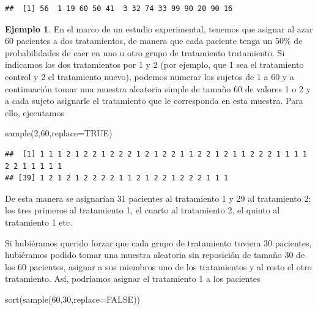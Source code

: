 \documentclass[
]{book}
\newenvironment{Shaded}{\begin{snugshade}}{\end{snugshade}}
\newcommand{\AttributeTok}[1]{\textcolor[rgb]{0.77,0.63,0.00}{#1}}
\newcommand{\ConstantTok}[1]{\textcolor[rgb]{0.00,0.00,0.00}{#1}}
\newcommand{\DecValTok}[1]{\textcolor[rgb]{0.00,0.00,0.81}{#1}}
\newcommand{\FunctionTok}[1]{\textcolor[rgb]{0.00,0.00,0.00}{#1}}
\newcommand{\NormalTok}[1]{#1}
\theoremstyle{definition}
\theoremstyle{definition}
\newtheorem{example}{Ejemplo}[chapter]
\theoremstyle{definition}
\theoremstyle{definition}
\theoremstyle{remark}
\begin{document}
\begin{verbatim}
##  [1] 56  1 19 60 50 41  3 32 74 33 99 90 20 90 16
\end{verbatim}

\begin{example}
\protect\hypertarget{exm:unnamed-chunk-69}{}\label{exm:unnamed-chunk-69}En el marco de un estudio experimental, tenemos que asignar al azar 60 pacientes a dos tratamientos, de manera que cada paciente tenga un 50\% de probabilidades de caer en uno u otro grupo de tratamiento tratamiento. Si indicamos los dos tratamientos por 1 y 2 (por ejemplo, que 1 sea el tratamiento control y 2 el tratamiento nuevo), podemos numerar los sujetos de 1 a 60 y a continuación tomar una muestra aleatoria simple de tamaño 60 de valores 1 o 2 y a cada sujeto asignarle el tratamiento que le corresponda en esta muestra. Para ello, ejecutamos
\end{example}

\begin{Shaded}
\begin{Highlighting}[]
\FunctionTok{sample}\NormalTok{(}\DecValTok{2}\NormalTok{,}\DecValTok{60}\NormalTok{,}\AttributeTok{replace=}\ConstantTok{TRUE}\NormalTok{)}
\end{Highlighting}
\end{Shaded}

\begin{verbatim}
##  [1] 1 1 1 2 1 2 2 1 2 2 2 1 2 1 2 2 1 1 2 2 1 2 1 1 2 2 2 1 1 1 1 2 2 1 1 1 1 1
## [39] 1 2 1 2 1 2 2 2 2 1 1 2 1 2 2 1 2 2 2 1 1 1
\end{verbatim}

De esta manera se asignarían 31 pacientes al tratamiento 1 y 29 al tratamiento 2: los tres primeros al tratamiento 1, el cuarto al tratamiento 2, el quinto al tratamiento 1 etc.

Si hubiéramos querido forzar que cada grupo de tratamiento tuviera 30 pacientes, hubiéramos podido tomar una muestra aleatoria sin reposición de tamaño 30 de los 60 pacientes, asignar a sus miembros uno de los tratamientos y al resto el otro tratamiento. Así, podríamos asignar el tratamiento 1 a los pacientes

\begin{Shaded}
\begin{Highlighting}[]
\FunctionTok{sort}\NormalTok{(}\FunctionTok{sample}\NormalTok{(}\DecValTok{60}\NormalTok{,}\DecValTok{30}\NormalTok{,}\AttributeTok{replace=}\ConstantTok{FALSE}\NormalTok{))}
\end{Highlighting}
\end{Shaded}
\end{document}
